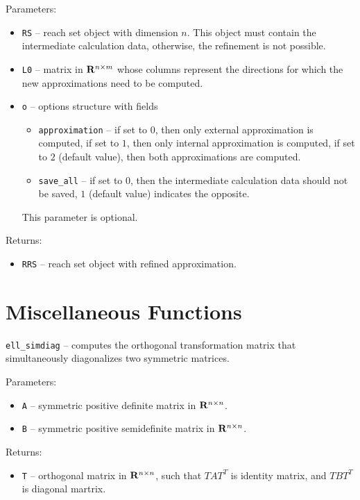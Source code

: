 Parameters:
\begin{itemize}
\item {\tt RS} -- reach set object with dimension $n$. This object must
contain the intermediate calculation data, otherwise, the refinement
is not possible.
\item {\tt L0} -- matrix in ${\bf R}^{n\times m}$ whose columns represent the
directions for which the new approximations need to be computed.
\item {\tt o} -- options structure with fields
\begin{itemize}
\item {\tt approximation} -- if set to $0$, then only external approximation
is computed, if set to $1$, then only internal approximation is computed,
if set to $2$ (default value), then both approximations are computed.
\item {\tt save\_all} -- if set to $0$, then the intermediate calculation
data should not be saved, $1$ (default value) indicates the opposite.
\end{itemize}
This parameter is optional.
\end{itemize}

Returns:
\begin{itemize}
\item {\tt RRS} -- reach set object with refined approximation.
\end{itemize}

\newpage

\section{Miscellaneous Functions}
{\Large {\tt ell\_simdiag}} -- computes the orthogonal transformation matrix
that simultaneously diagonalizes two symmetric matrices.

Parameters:
\begin{itemize}
\item {\tt A} -- symmetric positive definite matrix in ${\bf R}^{n\times n}$.
\item {\tt B} -- symmetric positive semidefinite matrix in ${\bf R}^{n\times n}$.
\end{itemize}

Returns:
\begin{itemize}
\item {\tt T} -- orthogonal matrix in ${\bf R}^{n\times n}$, such that
$TAT^T$ is identity matrix, and $TBT^T$ is diagonal martrix.
\end{itemize}

